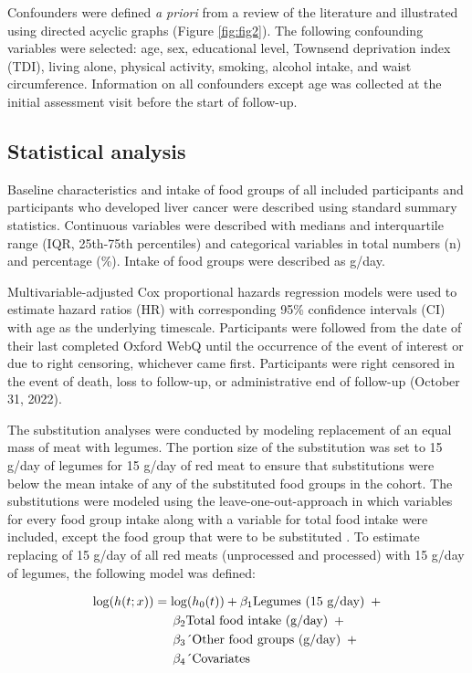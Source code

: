 \documentclass[
]{article}
\begin{document}
Confounders were defined \emph{a priori} from a review of the literature and
illustrated using directed acyclic graphs (Figure \ref{fig:fig2}). The
following confounding variables were selected: age, sex, educational
level, Townsend deprivation index (TDI), living alone, physical
activity, smoking, alcohol intake, and waist circumference. Information
on all confounders except age was collected at the initial assessment
visit before the start of follow-up.

\hypertarget{subsec6}{%
\subsection{Statistical analysis}\label{subsec6}}

Baseline characteristics and intake of food groups of all included
participants and participants who developed liver cancer were described
using standard summary statistics. Continuous variables were described
with medians and interquartile range (IQR, 25th-75th percentiles) and
categorical variables in total numbers (n) and percentage (\%). Intake of
food groups were described as g/day.

Multivariable-adjusted Cox proportional hazards regression models were
used to estimate hazard ratios (HR) with corresponding 95\% confidence
intervals (CI) with age as the underlying timescale. Participants were
followed from the date of their last completed Oxford WebQ until the
occurrence of the event of interest or due to right censoring, whichever
came first. Participants were right censored in the event of death, loss
to follow-up, or administrative end of follow-up (October 31, 2022).

The substitution analyses were conducted by modeling replacement of an
equal mass of meat with legumes. The portion size of the substitution
was set to 15 g/day of legumes for 15 g/day of red meat to ensure that
substitutions were below the mean intake of any of the substituted food
groups in the cohort. The substitutions were modeled using the
leave-one-out-approach in which variables for every food group intake
along with a variable for total food intake were included, except the
food group that were to be substituted \autocite{Ibsen2021}. To estimate
replacing of 15 g/day of all red meats (unprocessed and processed) with
15 g/day of legumes, the following model was defined:

{\small
\begin{align}
\log(h(t;x)) &= \log(h_0(t)) + \beta_1 \text{Legumes (15 g/day)} \hspace{0.5em} + \nonumber \\
&\quad \hspace{0.5em} \beta_2 \text{Total food intake (g/day)} \hspace{0.5em} + \nonumber \\
&\quad \hspace{0.5em} \beta_3 \text{´Other food groups (g/day)} \hspace{0.5em} + \nonumber \\
&\quad \hspace{0.5em} \beta_4 \text{´Covariates}
\end{align}
}
\end{document}
